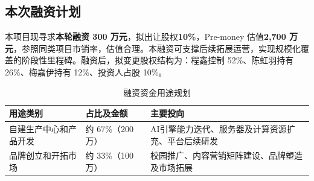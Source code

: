 \subsection{本次融资计划}

本项目现寻求\textbf{本轮融资 300 万元}，拟出让股权\textbf{10\%}，Pre-money 估值\textbf{2,700 万元}，参照同类项目市销率，估值合理。本融资可支撑后续拓展运营，实现规模化覆盖的阶段性里程碑。融资后，拟变更股权结构为：程鑫控制 52\%、陈虹羽持有 26\%、梅嘉伊持有 12\%、投资人占股 10\%。

\begin{table}[htbp]
  \centering
  \caption{融资资金用途规划}
  \label{tab:funding}
  \begin{tabular}{p{4.0cm}p{2.0cm}p{6.5cm}}
    \toprule
    \textbf{用途类别}     & \textbf{占比及金额} & \textbf{主要投向}                                  \\
    \midrule
    自建生产中心和产品开发 & 约 67\%（200万）    & AI引擎能力迭代、服务器及计算资源扩充、平台后续研发 \\
    品牌创立和开拓市场    & 约 33\%（100万）    & 校园推广、内容营销矩阵建设、品牌塑造及市场拓展     \\
    \bottomrule
  \end{tabular}
\end{table}

